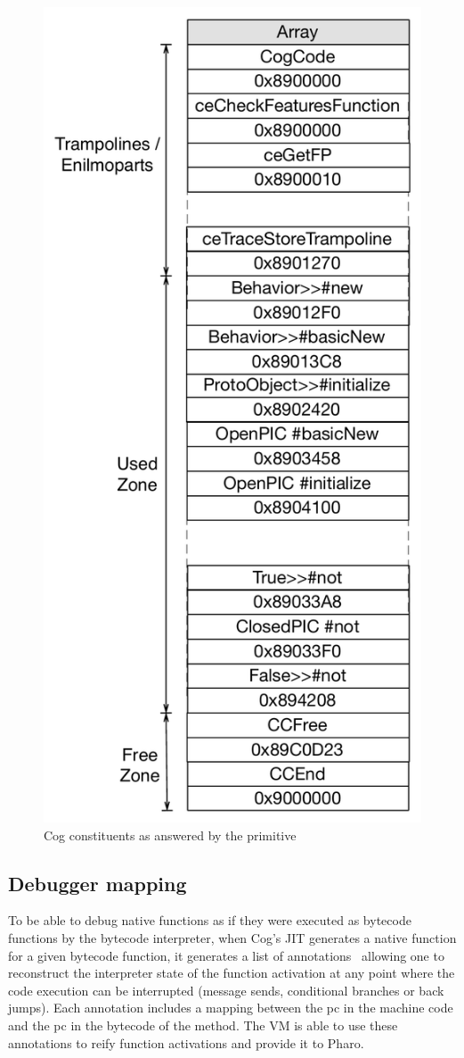 \documentclass[10pt,preprint,nonatbib]{sigplanconf}
\newcommand{\figlabel}[1]{\label{fig:#1}}
\begin{document}
 \begin{figure}[b!]
     \begin{center}
         \includegraphics[width=0.66\linewidth]{ContentsOfCollectCogCodePrim}
         \caption{Cog constituents as answered by the primitive}
         \figlabel{fig:ContentsOfCollectCogCodePrim}
     \end{center}
 \end{figure}
 
\subsection{Debugger mapping}

To be able to debug native functions as if they were executed as bytecode functions by the bytecode interpreter, when Cog's JIT generates a native function for a given bytecode function, it generates a list of annotations~\cite{Ber16d} allowing one to reconstruct the interpreter state of the function activation at any point where the code execution can be interrupted (message sends, conditional branches or back jumps). Each annotation includes a mapping between the pc in the machine code and the pc in the bytecode of the method. The VM is able to use these annotations to reify function activations and provide it to Pharo.
 
\end{document}

